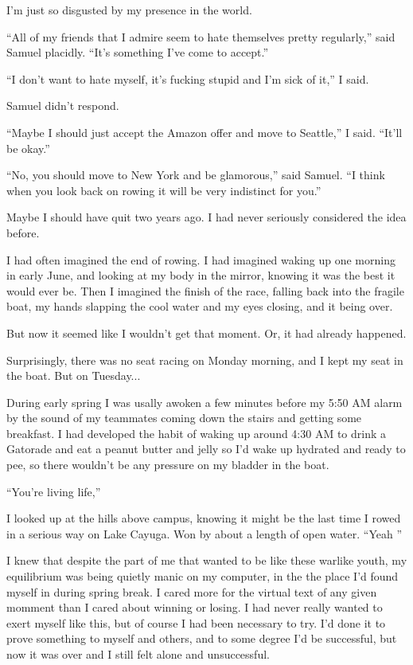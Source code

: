 I'm just so disgusted by my presence in the world.

``All of my friends that I admire seem to hate themselves pretty regularly,''
said Samuel placidly.  ``It's something I've come to accept.''

``I don't want to hate myself, it's fucking stupid and I'm sick of it,'' I said.  

Samuel didn't respond.

``Maybe I should just accept the Amazon offer and move to Seattle,'' I said.
``It'll be okay.''

``No, you should move to New York and be glamorous,'' said Samuel.  ``I think
when you look back on rowing it will be very indistinct for you.'' 

Maybe I should have quit two years ago.  I had never seriously considered the
idea before.

I had often imagined the end of rowing.  I had imagined waking up one morning in
early June, and looking at my body in the mirror, knowing it was the best it
would ever be.  Then I imagined  the finish of the race, falling back into the
fragile boat, my hands slapping the cool water and my eyes closing, and it being
over.

But now it seemed like I wouldn't get that moment.  Or, it had already happened.

Surprisingly, there was no seat racing on Monday morning, and I kept my seat in
the boat.  But on Tuesday...

During early spring I was usally awoken a few minutes before my 5:50 AM alarm by
the sound of my teammates coming down the stairs and getting some breakfast.  I
had developed the habit of waking up around 4:30 AM to drink a Gatorade and eat
a peanut butter and jelly so I'd wake up hydrated and ready to pee, so there
wouldn't be any pressure on my bladder in the boat. 

``You're living life,''

I looked up at the hills above campus, knowing it might be the last time I rowed
in a serious way on Lake Cayuga.  Won by about a length of open water.  ``Yeah
'' 

I knew that despite the part of me that wanted to be like these warlike youth,
my equilibrium was being quietly manic on my computer, in the the place I'd
found myself in during spring break.  I cared more for the virtual text of any
given momment than I cared about winning or losing.  I had never really wanted
to exert myself like this, but of course I had been necessary to try.  I'd done
it to prove something to myself and others, and to some degree I'd be
successful, but now it was over and I still felt alone and unsuccessful.

